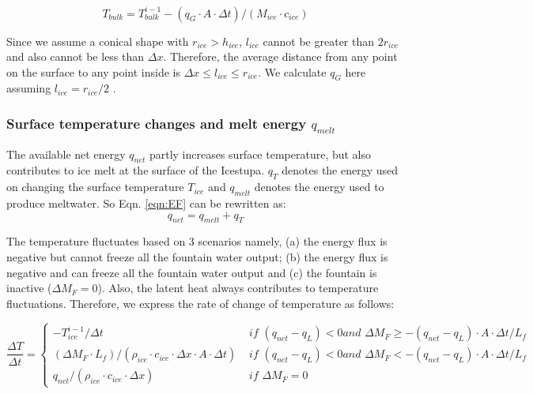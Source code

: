 \documentclass[utf8]{frontiersSCNS} %
\begin{document}
\begin{equation} T_{bulk} = T_{bulk}^{i-1} - (q_{G} \cdot A \cdot \Delta
t)/(M_{ice} \cdot c_{ice}) \end{equation}

Since we assume a conical shape with $r_{ice} > h_{ice}$, $l_{ice}$ cannot be
greater than $2r_{ice}$ and also cannot be less than $\Delta x$. Therefore,
the average distance from any point on the surface to any point inside is
$\Delta x \leq l_{ice} \leq r_{ice}$. We calculate $q_{G}$ here assuming
$l_{ice} = r_{ice}/2$ .

\subsubsection{Surface temperature changes and melt energy $q_{melt}$}

The available net energy $q_{net}$ partly increases surface temperature, but
also contributes to ice melt at the surface of the Icestupa. $q_{T}$ denotes
the energy used on changing the surface temperature $T_{ice}$ and $q_{melt}$
denotes the energy used to produce meltwater. So Eqn. \ref{eqn:EF} can be
rewritten as: \begin{equation}
    q_{net} = q_{melt} + q_{T}
\end{equation}

The temperature fluctuates based on 3 scenarios namely, (a) the energy flux is
negative but cannot freeze all the fountain water output; (b) the energy flux
is negative and can freeze all the fountain water output and (c) the fountain
is inactive ($\Delta M_{F}=0$). Also, the latent heat always contributes to
temperature fluctuations. Therefore, we express the rate of change of
temperature as follows:

\begin{equation} \frac{\Delta T}{\Delta t} = \left\{ \begin{array}{ll}
        -T_{ice}^{i-1}/\Delta t & \textit{ if } (q_{net}-q_{L}) < 0 \textit{
        and } \Delta M_{F} \geq -(q_{net}-q_{L})\cdot A \cdot \Delta t/L_f  \\
        (\Delta M_{F} \cdot L_f )/(\rho_{ice} \cdot c_{ice} \cdot  \Delta x
        \cdot A \cdot \Delta t) & \textit{ if } (q_{net}-q_{L}) < 0 \textit{
        and } \Delta M_{F} < -(q_{net}-q_{L})\cdot A \cdot \Delta t/L_f  \\
        q_{net}/ (\rho_{ice}\cdot c_{ice} \cdot \Delta x)& \textit{ if }
        \Delta M_{F} = 0
         
    \end{array} \right.
\label{eqn:T}
\end{equation}
\end{document}
